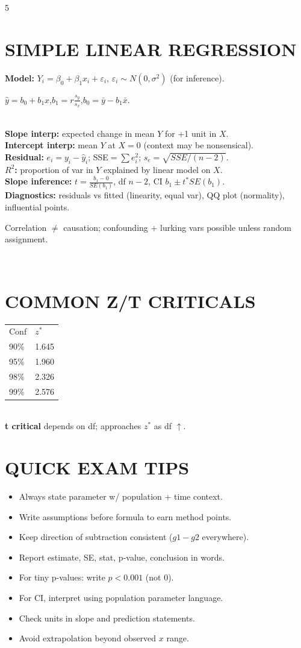 \documentclass[10pt,landscape,letterpaper]{article}
\newcommand{\concept}[1]{\textcolor{conceptcyan}{\textbf{#1}}}
\newcommand{\process}[1]{\textcolor{processpurple}{\textbf{#1}}}
\newcommand{\category}[1]{\textcolor{categorygreen}{\textbf{#1}}}
\newcommand{\important}[1]{{\setlength{\fboxsep}{1pt}\colorbox{highlightyellow}{\parbox{\dimexpr\linewidth-2\fboxsep\relax}{#1}}}}
\begin{document}
\begin{multicols}{5}
\section{SIMPLE LINEAR REGRESSION}
\concept{Model:} $Y_i=\beta_0+\beta_1 x_i+\varepsilon_i$, $\varepsilon_i\sim N(0,\sigma^2)$ (for inference).\\
\important{$\hat y=b_0+b_1x$,\quad $b_1=r\frac{s_y}{s_x}$,\quad $b_0=\bar y-b_1\bar x$.}\\
\concept{Slope interp:} expected change in mean $Y$ for +1 unit in $X$.\\
\concept{Intercept interp:} mean $Y$ at $X=0$ (context may be nonsensical).\\
\concept{Residual:} $e_i=y_i-\hat y_i$; SSE$=\sum e_i^2$; $s_e=\sqrt{SSE/(n-2)}$.\\
\concept{$R^2$:} proportion of var in $Y$ explained by linear model on $X$.\\
\category{Slope inference:} $t=\frac{b_1-0}{SE(b_1)}$, df $n-2$, CI $b_1\pm t^*SE(b_1)$.\\
\process{Diagnostics:} residuals vs fitted (linearity, equal var), QQ plot (normality), influential points.\\
\important{Correlation $\neq$ causation; confounding + lurking vars possible unless random assignment.}\\
\section{COMMON Z/T CRITICALS}
\begin{tabular}{@{}ll@{}}
Conf & $z^*$ \\
90\% & 1.645 \\
95\% & 1.960 \\
98\% & 2.326 \\
99\% & 2.576 \\
\end{tabular}\\
\concept{t critical} depends on df; approaches $z^*$ as df $\uparrow$.\\
\section{QUICK EXAM TIPS}
\begin{itemize}
\item Always state parameter w/ population + time context.
\item Write assumptions before formula to earn method points.
\item Keep direction of subtraction consistent ($g1-g2$ everywhere).
\item Report estimate, SE, stat, p-value, conclusion in words.
\item For tiny p-values: write $p<0.001$ (not $0$).
\item For CI, interpret using population parameter language.
\item Check units in slope and prediction statements.
\item Avoid extrapolation beyond observed $x$ range.
\end{itemize}
\end{multicols}
\end{document}
